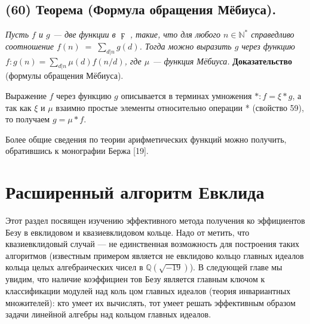 \documentclass{mai_book}
\begin{document}
\subsection*{(60) Теорема (Формула обращения Мёбиуса).}

\textit{Пусть $f$ и $g$ — две функции в $\digamma$ , такие, что для любого $n\in\mathbb{N}^*$ справедливо соотношение $f(n)\;=\;\sum\nolimits_{d|n}g(d)$. Тогда можно выразить $g$
через функцию $f: g(n)=\sum\nolimits_{d|n}\mu(d)f(n/d)$, где $\mu$ — функция Мёбиуса.}
\newpage
\textbf{Доказательство} (формулы обращения Мёбиуса).

Выражение $f$ через функцию $g$ описывается в терминах умножения
$*: f = \xi*g$, а так как $\xi$ и $\mu$ взаимно простые элементы относительно
 операции * (свойство 59), то получаем $g= \mu*f$.
 
Более общие сведения по теории арифметических функций можно
получить, обратившись к монографии Бержа [19].
\section{Расширенный алгоритм Евклида}
Этот раздел посвящен изучению эффективного метода получения ко­
эффициентов Безу в евклидовом и квазиевклидовом кольце. Надо от­
метить, что квазиевклидовый случай — не единственная возможность
для построения таких алгоритмов (известным примером является не­
евклидово кольцо главных идеалов кольца целых алгебраических чисел
в $\mathbb{Q}(\sqrt{-19})$). В следующей главе мы увидим, что наличие коэффициен­
тов Безу является главным ключом к классификации модулей над коль­
цом главных идеалов (теория инвариантных множителей): кто умеет их
вычислять, тот умеет решать эффективным образом задачи линейной
алгебры над кольцом главных идеалов.
\end{document}
